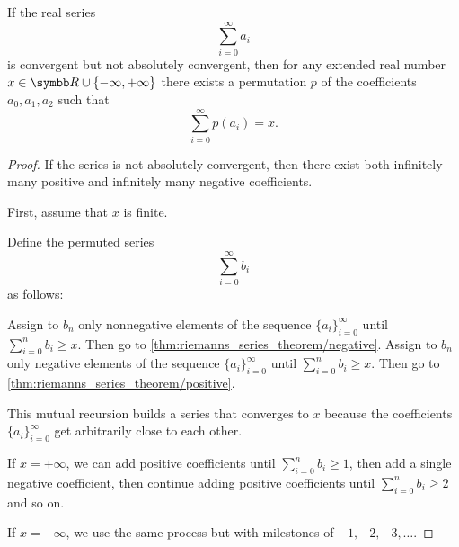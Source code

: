 \begin{theorem}\label{thm:riemanns_series_permutation_theorem}\cite[]{Фихтенгольц1968/2}
  If the real series
  \begin{equation*}
    \sum_{i=0}^\infty a_i
  \end{equation*}
  is convergent but not absolutely convergent, then for any extended real number \( x \in \R \cup \{ -\infty, +\infty \} \) there exists a permutation \( p \) of the coefficients \( a_0, a_1, a_2 \)
  such that
  \begin{equation*}
    \sum_{i=0}^\infty p(a_i) = x.
  \end{equation*}
\end{theorem}
\begin{proof}
  If the series is not absolutely convergent, then there exist both infinitely many positive and infinitely many negative coefficients.

  First, assume that \( x \) is finite.

  Define the permuted series
  \begin{equation*}
    \sum_{i=0}^\infty b_i
  \end{equation*}
  as follows:
  \begin{algenum}
     Assign to \( b_n \) only nonnegative elements of the sequence \( \{ a_i \}_{i=0}^\infty \) until \( \sum_{i=0}^n b_i \geq x \). Then go to \cref{thm:riemanns_series_theorem/negative}.
     Assign to \( b_n \) only negative elements of the sequence \( \{ a_i \}_{i=0}^\infty \) until \( \sum_{i=0}^n b_i \geq x \). Then go to \cref{thm:riemanns_series_theorem/positive}.
  \end{algenum}

  This mutual recursion builds a series that converges to \( x \) because the coefficients \( \{ a_i \}_{i=0}^\infty \) get arbitrarily close to each other.

  If \( x = +\infty \), we can add positive coefficients until \( \sum_{i=0}^n b_i \geq 1 \), then add a single negative coefficient, then continue adding positive coefficients until \( \sum_{i=0}^n b_i \geq 2 \) and so on.

  If \( x = -\infty \), we use the same process but with milestones of \( -1, -2, -3, \ldots \).
\end{proof}

